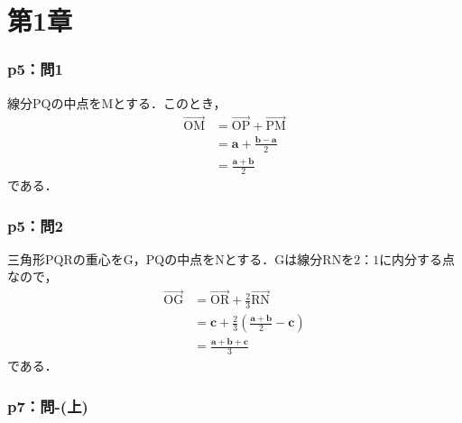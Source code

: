 
\part*{第1章}

\section*{p5：問1}

\begin{tproof}
  線分$\mathrm{PQ}$の中点を$\mathrm{M}$とする．このとき，
  \begin{align*}
    \overrightarrow{\mathrm{OM}} & = \overrightarrow{\mathrm{OP}} + \overrightarrow{\mathrm{PM}} \\
                                 & = \bm{a} + \frac{\bm{b}-\bm{a}}{2}                            \\
                                 & = \frac{\bm{a}+\bm{b}}{2}
  \end{align*}
  である．
\end{tproof}
\section*{p5：問2}
\begin{tproof}
  三角形$\mathrm{PQR}$の重心を$\mathrm{G}$，$\mathrm{PQ}$の中点を$\mathrm{N}$とする．$\mathrm{G}$は線分$\mathrm{RN}$を$2：1$に内分する点なので，
  \begin{align*}
    \overrightarrow{\mathrm{OG}} & = \overrightarrow{\mathrm{OR}} + \frac{2}{3} \overrightarrow{\mathrm{RN}} \\
                                 & = \bm{c}+ \frac{2}{3} \left (\frac{\bm{a}+\bm{b}}{2}-\bm{c} \right)       \\
                                 & = \frac{\bm{a}+\bm{b}+\bm{c}}{3}
  \end{align*}
  である．
\end{tproof}



\section*{p7：問-(上)}


